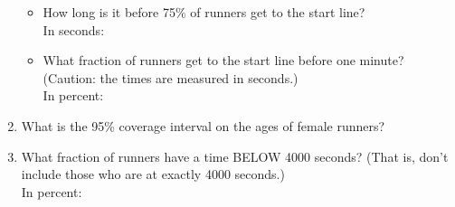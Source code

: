 \begin{enumerate}
\bigskip

\begin{itemize}
\item How long is it before 75\% of runners get to the start line?\\
In seconds:  

\bigskip


\item What fraction of runners get to the start line before one
  minute?  (Caution: the times are measured in seconds.)\\
In percent:  


\end{itemize}

\bigskip

\item What is the 95\% coverage interval on the ages of female
  runners?
\begin{MultipleChoice}
\end{MultipleChoice}

\bigskip

\item What fraction of runners have a  time BELOW 4000
  seconds?  (That is, don't include those who are at exactly 4000
  seconds.)\\
In percent:  


\end{enumerate}

